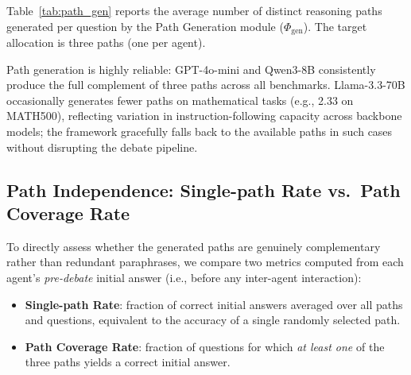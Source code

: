 Table~\ref{tab:path_gen} reports the average number of distinct reasoning paths generated per question by the Path Generation module ($\Phi_{\text{gen}}$). The target allocation is three paths (one per agent).

\begin{table}[h]
\centering
{}
\caption{Average number of reasoning paths generated per question. The target is 3 paths (one per agent).}
\label{tab:path_gen}
\end{table}

Path generation is highly reliable: GPT-4o-mini and Qwen3-8B consistently produce the full complement of three paths across all benchmarks. Llama-3.3-70B occasionally generates fewer paths on mathematical tasks (e.g., 2.33 on MATH500), reflecting variation in instruction-following capacity across backbone models; the framework gracefully falls back to the available paths in such cases without disrupting the debate pipeline.

\subsection{Path Independence: Single-path Rate vs.\ Path Coverage Rate}

To directly assess whether the generated paths are genuinely complementary rather than redundant paraphrases, we compare two metrics computed from each agent's \emph{pre-debate} initial answer (i.e., before any inter-agent interaction):

\begin{itemize}
    \item \textbf{Single-path Rate}: fraction of correct initial answers averaged over all paths and questions, equivalent to the accuracy of a single randomly selected path.
    \item \textbf{Path Coverage Rate}: fraction of questions for which \emph{at least one} of the three paths yields a correct initial answer.
\end{itemize}

